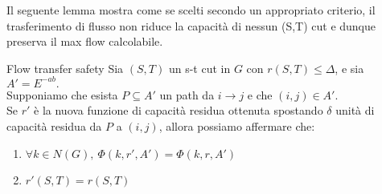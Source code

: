     Il seguente lemma mostra come se scelti secondo un appropriato criterio, il trasferimento di flusso non riduce la capacità di nessun (S,T) cut e dunque preserva il max flow calcolabile.
    \begin{lemma}[label = {ftsafe}]{Flow transfer safety}{}
        Sia $(S,T)$ un s-t cut in $G$ con $r(S,T)\le \Delta$, e sia $A' = E^{-ab}.$\\
        Supponiamo che esista $P\subseteq A'$ un path da $i\rightarrow j$ e che $(i,j)\in A'$. \\
        Se $r'$ è la nuova funzione di capacità residua ottenuta spostando $\delta$ unità di capacità residua da $P$ a $(i,j)$, allora possiamo affermare che:
        \begin{enumerate}
            \item $\forall k\in N(G),\ \Phi(k,r',A') = \Phi(k,r,A') $
            \item $r'(S,T) = r(S,T)$
        \end{enumerate}
        
    \end{lemma}
